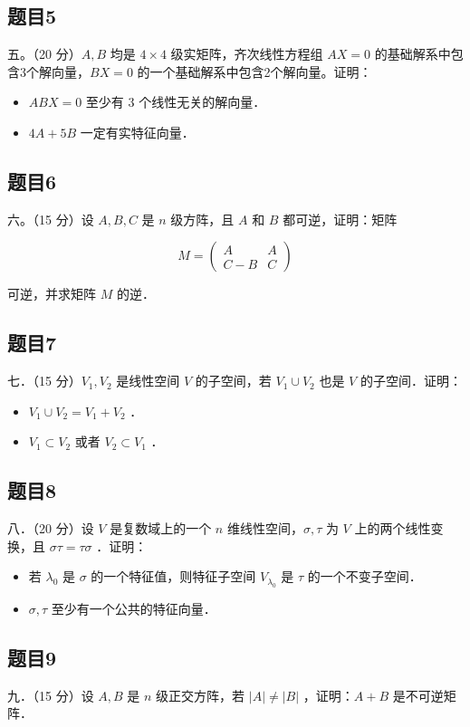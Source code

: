 \documentclass{article}
\begin{document}
\subsection{题目5}
五。（20 分）\(A, B\) 均是 \(4 \times 4\) 级实矩阵，齐次线性方程组 \(A X=0\) 的基础解系中包含3个解向量，\(B X=0\) 的一个基础解系中包含2个解向量。证明：

\begin{itemize}
  \item[（1）] \(A B X=0\) 至少有 3 个线性无关的解向量．
  \item[（2）] \(4 A+5 B\) 一定有实特征向量．
\end{itemize}

\subsection{题目6}
六。（15 分）设 \(A, B, C\) 是 \(n\) 级方阵，且 \(A\) 和 \(B\) 都可逆，证明：矩阵

\[
M=\left(\begin{array}{cc}
A & A \\
C-B & C
\end{array}\right)
\]

可逆，并求矩阵 \(M\) 的逆．

\subsection{题目7}
七．（15 分）\(V_{1}, V_{2}\) 是线性空间 \(V\) 的子空间，若 \(V_{1} \cup V_{2}\) 也是 \(V\) 的子空间．证明：

\begin{itemize}
  \item[（1）] \(V_{1} \cup V_{2}=V_{1}+V_{2}\) ．
  \item[（2）] \(V_{1} \subset V_{2}\) 或者 \(V_{2} \subset V_{1}\) ．
\end{itemize}

\subsection{题目8}
八．（20 分）设 \(V\) 是复数域上的一个 \(n\) 维线性空间，\(\sigma, \tau\) 为 \(V\) 上的两个线性变换，且 \(\sigma \tau=\tau \sigma\) ．证明：

\begin{itemize}
  \item[（1）] 若 \(\lambda_{0}\) 是 \(\sigma\) 的一个特征值，则特征子空间 \(V_{\lambda_{0}}\) 是 \(\tau\) 的一个不变子空间．
  \item[（2）] \(\sigma, \tau\) 至少有一个公共的特征向量．
\end{itemize}

\subsection{题目9}
九．（15 分）设 \(A, B\) 是 \(n\) 级正交方阵，若 \(|A| \neq|B|\) ，证明：\(A+B\) 是不可逆矩阵．
\end{document}
